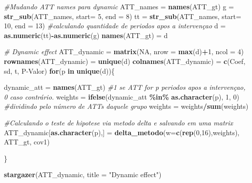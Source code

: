 \documentclass[
]{article}
\newenvironment{Shaded}{\begin{snugshade}}{\end{snugshade}}
\newcommand{\AttributeTok}[1]{\textcolor[rgb]{0.13,0.29,0.53}{#1}}
\newcommand{\CommentTok}[1]{\textcolor[rgb]{0.56,0.35,0.01}{\textit{#1}}}
\newcommand{\ConstantTok}[1]{\textcolor[rgb]{0.56,0.35,0.01}{#1}}
\newcommand{\ControlFlowTok}[1]{\textcolor[rgb]{0.13,0.29,0.53}{\textbf{#1}}}
\newcommand{\DecValTok}[1]{\textcolor[rgb]{0.00,0.00,0.81}{#1}}
\newcommand{\FunctionTok}[1]{\textcolor[rgb]{0.13,0.29,0.53}{\textbf{#1}}}
\newcommand{\NormalTok}[1]{#1}
\newcommand{\OtherTok}[1]{\textcolor[rgb]{0.56,0.35,0.01}{#1}}
\newcommand{\SpecialCharTok}[1]{\textcolor[rgb]{0.81,0.36,0.00}{\textbf{#1}}}
\newcommand{\StringTok}[1]{\textcolor[rgb]{0.31,0.60,0.02}{#1}}
\begin{document}
\begin{Shaded}
\begin{Highlighting}[]
\CommentTok{\#Mudando ATT names para \textquotesingle{}dynamic\textquotesingle{}}
\NormalTok{ATT\_names }\OtherTok{=} \FunctionTok{names}\NormalTok{(ATT\_gt)}
\NormalTok{g }\OtherTok{=} \FunctionTok{str\_sub}\NormalTok{(ATT\_names,  }\AttributeTok{start=} \DecValTok{5}\NormalTok{, }\AttributeTok{end =}  \DecValTok{8}\NormalTok{)}
\NormalTok{tt }\OtherTok{=} \FunctionTok{str\_sub}\NormalTok{(ATT\_names,  }\AttributeTok{start=} \DecValTok{10}\NormalTok{, }\AttributeTok{end =}  \DecValTok{13}\NormalTok{)}
\CommentTok{\#calculando quantidade de periodos apos a intervençao}
\NormalTok{d }\OtherTok{=} \FunctionTok{as.numeric}\NormalTok{(tt)}\SpecialCharTok{{-}}\FunctionTok{as.numeric}\NormalTok{(g)}
\FunctionTok{names}\NormalTok{(ATT\_gt) }\OtherTok{=}\NormalTok{ d}

\CommentTok{\# Dynamic effect}
\NormalTok{ATT\_dynamic }\OtherTok{=} \FunctionTok{matrix}\NormalTok{(}\ConstantTok{NA}\NormalTok{, }\AttributeTok{nrow =} \FunctionTok{max}\NormalTok{(d)}\SpecialCharTok{+}\DecValTok{1}\NormalTok{, }\AttributeTok{ncol =} \DecValTok{4}\NormalTok{)}
\FunctionTok{rownames}\NormalTok{(ATT\_dynamic) }\OtherTok{=} \FunctionTok{unique}\NormalTok{(d)}
\FunctionTok{colnames}\NormalTok{(ATT\_dynamic) }\OtherTok{=} \FunctionTok{c}\NormalTok{(}\StringTok{\textquotesingle{}Coef\textquotesingle{}}\NormalTok{, }\StringTok{\textquotesingle{}sd\textquotesingle{}}\NormalTok{, }\StringTok{\textquotesingle{}t\textquotesingle{}}\NormalTok{, }\StringTok{\textquotesingle{}P{-}Valor\textquotesingle{}}\NormalTok{)}
\ControlFlowTok{for}\NormalTok{(p }\ControlFlowTok{in} \FunctionTok{unique}\NormalTok{(d))\{}
  
\NormalTok{  dynamic\_att }\OtherTok{=} \FunctionTok{names}\NormalTok{(ATT\_gt)}
  \CommentTok{\#1 se ATT for p periodos apos a intervençao, 0 caso contrário.}
\NormalTok{  weights }\OtherTok{=} \FunctionTok{ifelse}\NormalTok{(dynamic\_att }\SpecialCharTok{\%in\%} \FunctionTok{as.character}\NormalTok{(p), }\DecValTok{1}\NormalTok{, }\DecValTok{0}\NormalTok{)}
  \CommentTok{\#dividindo pelo número de ATTs daquele grupo}
\NormalTok{  weights }\OtherTok{=}\NormalTok{ weights}\SpecialCharTok{/}\FunctionTok{sum}\NormalTok{(weights)}
  
  \CommentTok{\#Calculando o teste de hipotese via metodo delta e salvando em uma matrix}
\NormalTok{  ATT\_dynamic[}\FunctionTok{as.character}\NormalTok{(p),] }\OtherTok{=} \FunctionTok{delta\_metodo}\NormalTok{(}\AttributeTok{w=}\FunctionTok{c}\NormalTok{(}\FunctionTok{rep}\NormalTok{(}\DecValTok{0}\NormalTok{,}\DecValTok{16}\NormalTok{),weights), ATT\_gt, cov1)}
  
\NormalTok{\}}

\FunctionTok{stargazer}\NormalTok{(ATT\_dynamic, }\AttributeTok{title =} \StringTok{"Dynamic effect"}\NormalTok{)}
\end{Highlighting}
\end{Shaded}
\end{document}
